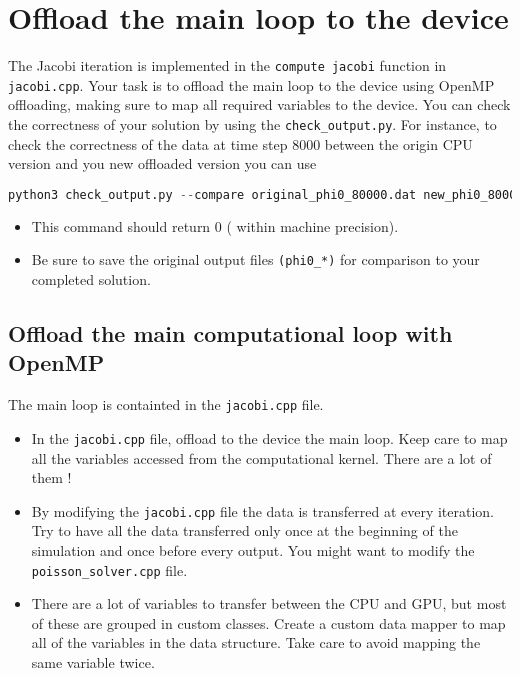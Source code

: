 \documentclass{article}
\begin{document}
\section{Offload the main loop to the device}

The Jacobi iteration is implemented in the \texttt{compute jacobi} function in \texttt{jacobi.cpp}.
Your task is to offload the main loop to the device using OpenMP offloading, making sure to map all required variables to the device.
You can check the correctness of your solution by using the \texttt{check\_output.py}. For instance, to check the correctness  of the data at time step 8000 between the origin CPU version and you new offloaded version you can use

\begin{lstlisting}[language=Python]
python3 check_output.py --compare original_phi0_80000.dat new_phi0_80000.dat
\end{lstlisting}

\begin{itemize}
    \item This command should return $0$ ( within machine precision).
    \item Be sure to save the original output files \texttt{(phi0\_*)} for comparison to your completed solution. 
\end{itemize}

\subsection{Offload the main computational loop with OpenMP}
The main loop is containted in the \texttt{jacobi.cpp} file.
\begin{itemize}
    \item In the \texttt{jacobi.cpp} file, offload to the device the main loop. Keep care to map all the variables accessed from the computational kernel. There are a lot of them !
    \item By modifying the \texttt{jacobi.cpp} file the data is transferred at every iteration. Try to have all the data transferred only once at the beginning of the simulation and once before every output. You might want to modify the \texttt{poisson\_solver.cpp} file.
    \item There are a lot of variables to transfer between the CPU and GPU, but most of these are grouped in custom classes. Create a custom data mapper to map all of the variables in the data structure. Take care to avoid mapping the same variable twice.
    
\end{itemize}
    
\end{document}
